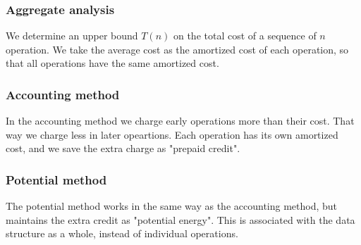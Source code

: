 \subsubsection*{Aggregate analysis}
We determine an upper bound $T(n)$ on the total cost of a sequence of $n$
operation. We take the average cost as the amortized cost of each operation, so
that all operations have the same amortized cost.

\subsubsection*{Accounting method}
In the accounting method we charge early operations more than their cost. That
way we charge less in later opeartions. Each operation has its own amortized
cost, and we save the extra charge as "prepaid credit".

\subsubsection*{Potential method}
The potential method works in the same way as the accounting method, but
maintains the extra credit as "potential energy". This is associated with the
data structure as a whole, instead of individual operations.
